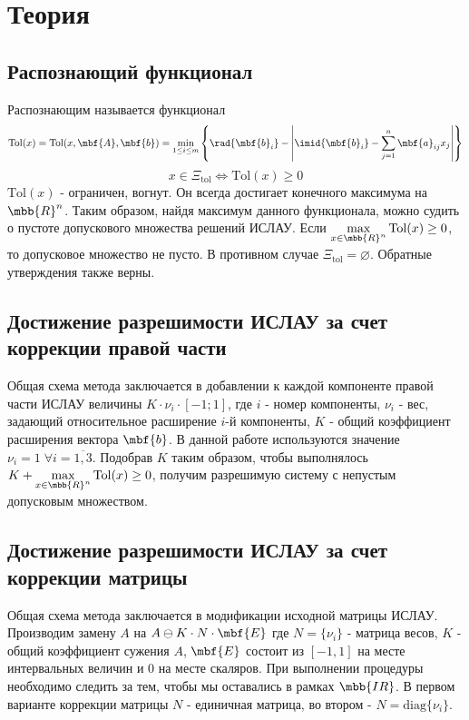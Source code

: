 \documentclass[a4paper]{article}
\begin{document}
\section{Теория}
\subsection{Распознающий функционал}
Распознающим называется функционал 
\begin{equation*}
    \mathrm{Tol}(x)=\mathrm{Tol}(x,\mbf{A},\mbf{b})=\min_{1\leq i\leq m}\left\{\rad{\mbf{b}_i}-\left|\imid{\mbf{b}_i}-\sum_{j=1}^n \mbf{a}_{ij}x_j\right|\right\}
\end{equation*}
\begin{equation*}
    x\in\Xi_{\mathrm{tol}}\Leftrightarrow\mathrm{Tol}(x)\geq0
\end{equation*}
$\mathrm{Tol}(x)$ - ограничен, вогнут. Он всегда достигает конечного максимума на $\mbb{R}^n$. Таким образом, найдя максимум данного функционала, можно судить о пустоте допускового множества решений ИСЛАУ. Если $\max\limits_{x\in\mbb{R}^n}\mathrm{Tol}(x)\geq0$, то допусковое множество не пусто. В противном случае $\Xi_{\mathrm{tol}}=\varnothing$. Обратные утверждения также верны.
\subsection{Достижение разрешимости ИСЛАУ за счет коррекции правой части}
Общая схема метода заключается в добавлении к каждой компоненте правой части ИСЛАУ величины $K\cdot\nu_i\cdot[-1;1]$, где $i$ - номер компоненты, $\nu_i$ - вес, задающий относительное расширение $i$-й компоненты, $K$ - общий коэффициент расширения вектора $\mbf{b}$. В данной работе используются значение $\nu_i=1\;\forall i=\overline{1,3}$. Подобрав $K$ таким образом, чтобы выполнялось $ K +\max\limits_{x\in\mbb{R}^n}\mathrm{Tol}(x)\geq0$, получим разрешимую систему с непустым допусковым множеством.
\subsection{Достижение разрешимости ИСЛАУ за счет коррекции матрицы}
Общая схема метода заключается в модификации исходной матрицы ИСЛАУ. Производим замену $A$ на $A\ominus K\cdot N\cdot\mbf{E}$ где $ N=\{\nu_i\}$ - матрица весов, $K$ - общий коэффициент сужения $A$, $\mbf{E}$ состоит из $[-1,1]$ на месте интервальных величин и $0$ на месте скаляров. При выполнении процедуры необходимо следить за тем, чтобы мы оставались в рамках $\mbb{IR}$. В первом варианте коррекции матрицы $ N$ - единичная матрица, во втором - $ N=\mathrm{diag}\{\nu_i\}$. 
\end{document}
